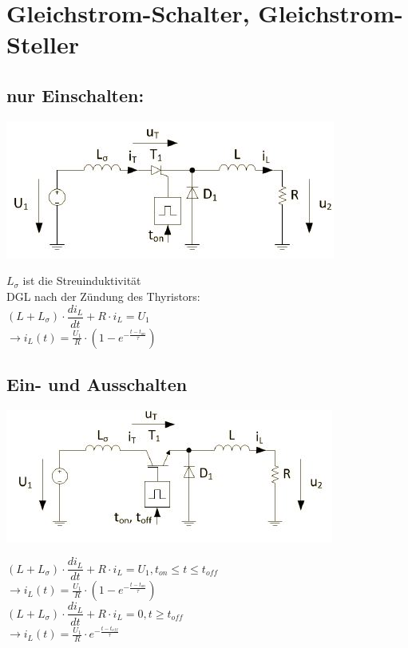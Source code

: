 \section{Gleichstrom-Schalter, Gleichstrom-Steller}
\subsection{nur Einschalten:}
  \begin{minipage}{0.5 \linewidth}
    \includegraphics[width = \linewidth]{./pictures/gleichstromschalter}
  \end{minipage}
  \hfill
  \begin{minipage}{0.5 \linewidth}
    $L_{\sigma}$ ist die Streuinduktivität\\
    DGL nach der Zündung des Thyristors:\\
    $(L+L_{\sigma})\cdot \dfrac{di_{L}}{dt}+R\cdot i_{L}= U_{1}$\\
    $\rightarrow i_{L}(t)= \frac{U_{1}}{R}\cdot (1-e^{-\frac{t-t_{on}}{\tau}})$
  \end{minipage}

\subsection{Ein- und Ausschalten}

  \begin{minipage}{0.5 \linewidth}
    \includegraphics[width = \linewidth]{./pictures/gleichstromschalter2}
  \end{minipage}
  \hfill
  \begin{minipage}{0.5 \linewidth}
    $(L+L_{\sigma})\cdot \dfrac{di_{L}}{dt}+R\cdot i_{L}= U_{1},  t_{on} \leqslant t \leqslant t_{off}$\\
    $\rightarrow i_{L}(t)= \frac{U_{1}}{R}\cdot (1-e^{-\frac{t-t_{on}}{\tau}})$\\
    $(L+L_{\sigma})\cdot \dfrac{di_{L}}{dt}+R\cdot i_{L}= 0,  t \geqslant t_{off}$\\
    $\rightarrow i_{L}(t) = \frac{U_{1}}{R} \cdot e^{-\frac{t-t_{off}}{\tau}}$
  \end{minipage}

